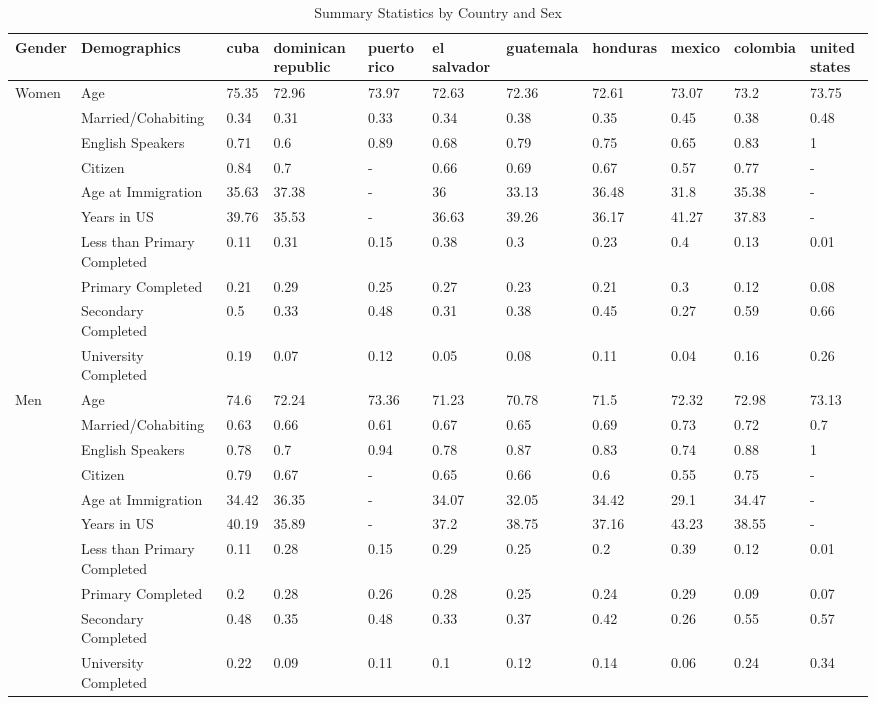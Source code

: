 \documentclass[
]{article}
\begin{document}
\begin{landscape}
\begin{table}[ht]
\centering
\caption{Summary Statistics by Country and Sex} 
\begingroup\small
\begin{tabular}{l|l|lllllllll}
  \hline
Gender & Demographics & cuba & dominican republic & puerto rico & el salvador & guatemala & honduras & mexico & colombia & united states \\ 
  \hline
Women & Age & 75.35 & 72.96 & 73.97 & 72.63 & 72.36 & 72.61 & 73.07 & 73.2 & 73.75 \\ 
   & Married/Cohabiting & 0.34 & 0.31 & 0.33 & 0.34 & 0.38 & 0.35 & 0.45 & 0.38 & 0.48 \\ 
   & English Speakers & 0.71 & 0.6 & 0.89 & 0.68 & 0.79 & 0.75 & 0.65 & 0.83 & 1 \\ 
   & Citizen & 0.84 & 0.7 & - & 0.66 & 0.69 & 0.67 & 0.57 & 0.77 & - \\ 
   & Age at Immigration & 35.63 & 37.38 & - & 36 & 33.13 & 36.48 & 31.8 & 35.38 & - \\ 
   & Years in US & 39.76 & 35.53 & - & 36.63 & 39.26 & 36.17 & 41.27 & 37.83 & - \\ 
   & Less than Primary Completed & 0.11 & 0.31 & 0.15 & 0.38 & 0.3 & 0.23 & 0.4 & 0.13 & 0.01 \\ 
   & Primary Completed & 0.21 & 0.29 & 0.25 & 0.27 & 0.23 & 0.21 & 0.3 & 0.12 & 0.08 \\ 
   & Secondary Completed & 0.5 & 0.33 & 0.48 & 0.31 & 0.38 & 0.45 & 0.27 & 0.59 & 0.66 \\ 
   & University Completed & 0.19 & 0.07 & 0.12 & 0.05 & 0.08 & 0.11 & 0.04 & 0.16 & 0.26 \\ 
  Men & Age & 74.6 & 72.24 & 73.36 & 71.23 & 70.78 & 71.5 & 72.32 & 72.98 & 73.13 \\ 
   & Married/Cohabiting & 0.63 & 0.66 & 0.61 & 0.67 & 0.65 & 0.69 & 0.73 & 0.72 & 0.7 \\ 
   & English Speakers & 0.78 & 0.7 & 0.94 & 0.78 & 0.87 & 0.83 & 0.74 & 0.88 & 1 \\ 
   & Citizen & 0.79 & 0.67 & - & 0.65 & 0.66 & 0.6 & 0.55 & 0.75 & - \\ 
   & Age at Immigration & 34.42 & 36.35 & - & 34.07 & 32.05 & 34.42 & 29.1 & 34.47 & - \\ 
   & Years in US & 40.19 & 35.89 & - & 37.2 & 38.75 & 37.16 & 43.23 & 38.55 & - \\ 
   & Less than Primary Completed & 0.11 & 0.28 & 0.15 & 0.29 & 0.25 & 0.2 & 0.39 & 0.12 & 0.01 \\ 
   & Primary Completed & 0.2 & 0.28 & 0.26 & 0.28 & 0.25 & 0.24 & 0.29 & 0.09 & 0.07 \\ 
   & Secondary Completed & 0.48 & 0.35 & 0.48 & 0.33 & 0.37 & 0.42 & 0.26 & 0.55 & 0.57 \\ 
   & University Completed & 0.22 & 0.09 & 0.11 & 0.1 & 0.12 & 0.14 & 0.06 & 0.24 & 0.34 \\ 
   \hline
\end{tabular}
\endgroup
\end{table}


\end{landscape}
\end{document}
